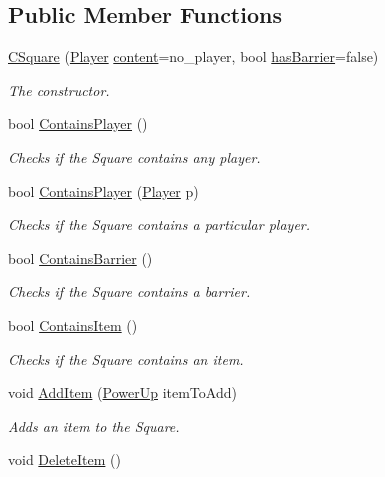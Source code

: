 \subsection*{Public Member Functions}
\begin{DoxyCompactItemize}
\item 
\hyperlink{class_c_square_a4bbe681a17a8bc59817bd5e45d832ca2}{C\-Square} (\hyperlink{common_8hpp_a3b27da0d46d4c36bc71511bcea2db296}{Player} \hyperlink{class_c_square_ac8b1e1733091b86c3c1fedfa73a1ef11}{content}=no\-\_\-player, bool \hyperlink{class_c_square_a32454efe4a8f4ac87fbc9868306560e2}{has\-Barrier}=false)
\begin{DoxyCompactList}\small\item\em The constructor. \end{DoxyCompactList}\item 
bool \hyperlink{class_c_square_a618612b48dff26cbe8197f2371d6c78e}{Contains\-Player} ()
\begin{DoxyCompactList}\small\item\em Checks if the Square contains any player. \end{DoxyCompactList}\item 
bool \hyperlink{class_c_square_a1c2b3e4c631dd711bf34899d52f8d081}{Contains\-Player} (\hyperlink{common_8hpp_a3b27da0d46d4c36bc71511bcea2db296}{Player} p)
\begin{DoxyCompactList}\small\item\em Checks if the Square contains a particular player. \end{DoxyCompactList}\item 
bool \hyperlink{class_c_square_a983368c041402ea321b39a30e1a4c71a}{Contains\-Barrier} ()
\begin{DoxyCompactList}\small\item\em Checks if the Square contains a barrier. \end{DoxyCompactList}\item 
bool \hyperlink{class_c_square_aee8e014954d295f0e73e3170f36866a9}{Contains\-Item} ()
\begin{DoxyCompactList}\small\item\em Checks if the Square contains an item. \end{DoxyCompactList}\item 
void \hyperlink{class_c_square_ab65d8ba292e16113b67a17bdaa85ce46}{Add\-Item} (\hyperlink{common_8hpp_ab119e1d9a1ae19c7528143bf1fe16c3a}{Power\-Up} item\-To\-Add)
\begin{DoxyCompactList}\small\item\em Adds an item to the Square. \end{DoxyCompactList}\item 
\hypertarget{class_c_square_a168e70962e8656c6c01045c48928b882}{void \hyperlink{class_c_square_a168e70962e8656c6c01045c48928b882}{Delete\-Item} ()}\label{class_c_square_a168e70962e8656c6c01045c48928b882}


\end{DoxyCompactItemize}
